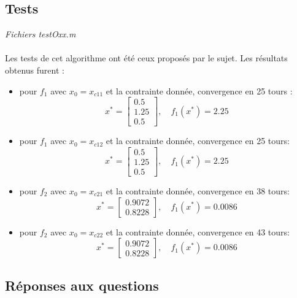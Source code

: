 \documentclass[12pt]{article}
\begin{document}
\subsection{Tests}
\begin{flushright}
\textit{Fichiers testOxx.m}
\end{flushright}
\paragraph{}
Les tests de cet algorithme ont été ceux proposés par le sujet. Les résultats obtenus furent :
\begin{itemize}
	\item pour $f_1$ avec $x_0 = x_{c11}$ et la contrainte donnée, convergence en 25 tours :
		\[x^* = \left[\begin{array}{c}0.5\\1.25\\0.5\end{array}\right],\quad f_1(x^*) = 2.25\]
	\item pour $f_1$ avec $x_0 = x_{c12}$ et la contrainte donnée, convergence en 25 tours:
		\[x^* = \left[\begin{array}{c}0.5\\1.25\\0.5\end{array}\right],\quad f_1(x^*) = 2.25\]
	\item pour $f_2$ avec $x_0 = x_{c21}$ et la contrainte donnée, convergence en 38 tours:
		\[x^* = \left[\begin{array}{c}0.9072\\0.8228\end{array}\right],\quad f_1(x^*) = 0.0086\]
	\item pour $f_2$ avec $x_0 = x_{c22}$ et la contrainte donnée, convergence en 43 tours:
		\[x^* = \left[\begin{array}{c}0.9072\\0.8228\end{array}\right],\quad f_1(x^*) = 0.0086\]
\end{itemize}

\subsection{Réponses aux questions}
\end{document}
